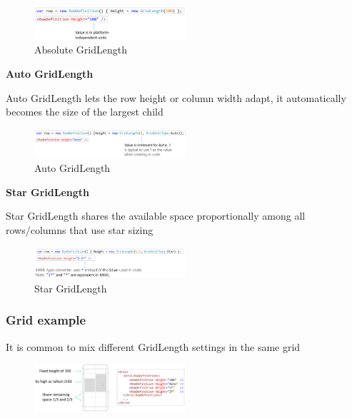 \documentclass{article}
\newcommand{\bold}[1]{\textbf{#1}}
\begin{document}
\begin{figure}[H]
    \centering
    \includegraphics[width=0.5\textwidth]{xaml-grid-length-abs.png}
    \caption{Absolute GridLength}
\end{figure}

\bold{Auto GridLength}

Auto GridLength lets the row height or column width adapt, it automatically
becomes the size of the largest child

\begin{figure}[H]
    \centering
    \includegraphics[width=0.5\textwidth]{xaml-grid-length-auto.png}
    \caption{Auto GridLength}
\end{figure}

\bold{Star GridLength}

Star GridLength shares the available space proportionally among all rows/columns
that use star sizing

\begin{figure}[H]
    \centering
    \includegraphics[width=0.5\textwidth]{xaml-grid-length-star.png}
    \caption{Star GridLength}
\end{figure}

\subsubsection{Grid example}

It is common to mix different GridLength settings in the same grid

\begin{figure}[H]
    \centering
    \includegraphics[width=0.5\textwidth]{xaml-grid-example.png}
    \caption{}
\end{figure}
\end{document}
